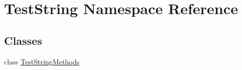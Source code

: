 \hypertarget{namespace_test_string}{}\section{Test\+String Namespace Reference}
\label{namespace_test_string}
\subsection*{Classes}
\begin{DoxyCompactItemize}
\item 
class \hyperlink{class_test_string_1_1_test_string_methods}{Test\+String\+Methods}
\end{DoxyCompactItemize}
